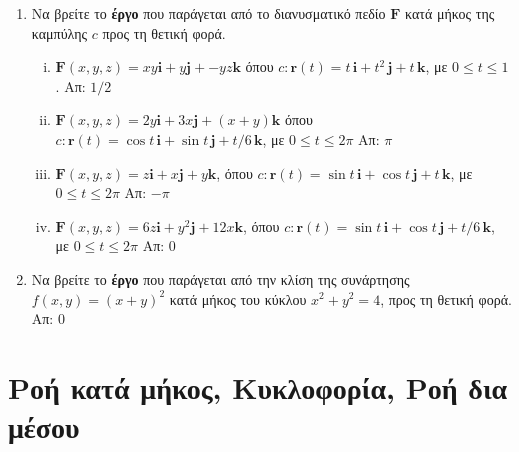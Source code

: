 \begin{enumerate}
  \item Να βρείτε το \textbf{έργο} που παράγεται από το διανυσματικό πεδίο 
    $ \mathbf{F} $ κατά μήκος της καμπύλης $c$ προς τη θετική φορά.
    \begin{enumerate}[i)]
      \item $ \mathbf{F}(x,y,z) = xy \mathbf{i} + y \mathbf{j} + -yz \mathbf{k}
        $ όπου $ c \colon \mathbf{r}(t)=t\, \mathbf{i} + t^{2}\, \mathbf{j} + t \,
        \mathbf{k}$, με $ 0 \leq t \leq 1 $. 
        \hfill Απ: $ 1/2 $ 
      \item $ \mathbf{F}(x,y,z) = 2y \mathbf{i} + 3x \mathbf{j} + (x+y) \mathbf{k}
        $ όπου $ c \colon \mathbf{r}(t)= \cos{t}\, \mathbf{i} + \sin{t}\, 
        \mathbf{j} + t/6 \, \mathbf{k} $, με $ 0 \leq t \leq 2 \pi $ 
        \hfill Απ: $ \pi $ 
      \item $ \mathbf{F}(x,y,z) = z \mathbf{i} + x \mathbf{j} + y \mathbf{k}
        $, όπου $ c \colon \mathbf{r}(t)= \sin{t}\, \mathbf{i} + \cos{t}\, 
        \mathbf{j} + t \, \mathbf{k}$, με $ 0 \leq t \leq 2 \pi $ 
        \hfill Απ: $ - \pi $  
      \item $ \mathbf{F}(x,y,z) = 6z \mathbf{i} + y^{2} \mathbf{j} + 12 x \mathbf{k}
        $, όπου $ c \colon \mathbf{r}(t)= \sin{t}\, \mathbf{i} + \cos{t}\, 
        \mathbf{j} + t/6 \, \mathbf{k}$, με $ 0 \leq t \leq 2 \pi $ 
        \hfill Απ: 0  
    \end{enumerate}

  \item Να βρείτε το \textbf{έργο} που παράγεται από την κλίση της συνάρτησης 
    $ f(x,y) = (x+y)^{2} $ κατά μήκος του κύκλου $ x^{2}+y^{2}=4 $, προς τη θετική φορά. 
    \hfill Απ: 0  
\end{enumerate}


\section*{Ροή κατά μήκος, Κυκλοφορία, Ροή δια μέσου}

